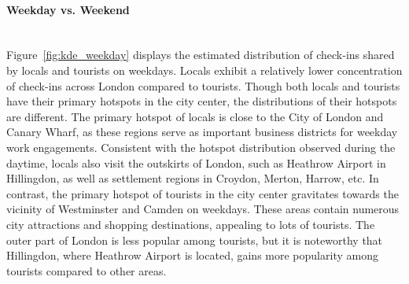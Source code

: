 \documentclass{article}
\newcommand{\subsubsubsection}[1]{\paragraph{#1}\mbox{}\\}
\theoremstyle{remark}
\begin{document}
\subsubsubsection{Weekday vs. Weekend}
Figure~\ref{fig:kde_weekday} displays the estimated distribution of check-ins shared by locals and tourists on weekdays. Locals exhibit a relatively lower concentration of check-ins across London compared to tourists. Though both locals and tourists have their primary hotspots in the city center, the distributions of their hotspots are different. The primary hotspot of locals is close to the City of London and Canary Wharf, as these regions serve as important business districts for weekday work engagements. Consistent with the hotspot distribution observed during the daytime, locals also visit the outskirts of London, such as Heathrow Airport in Hillingdon, as well as settlement regions in Croydon, Merton, Harrow, etc. In contrast, the primary hotspot of tourists in the city center gravitates towards the vicinity of Westminster and Camden on weekdays. These areas contain numerous city attractions and shopping destinations, appealing to lots of tourists. The outer part of London is less popular among tourists, but it is noteworthy that Hillingdon, where Heathrow Airport is located, gains more popularity among tourists compared to other areas.
\end{document}
